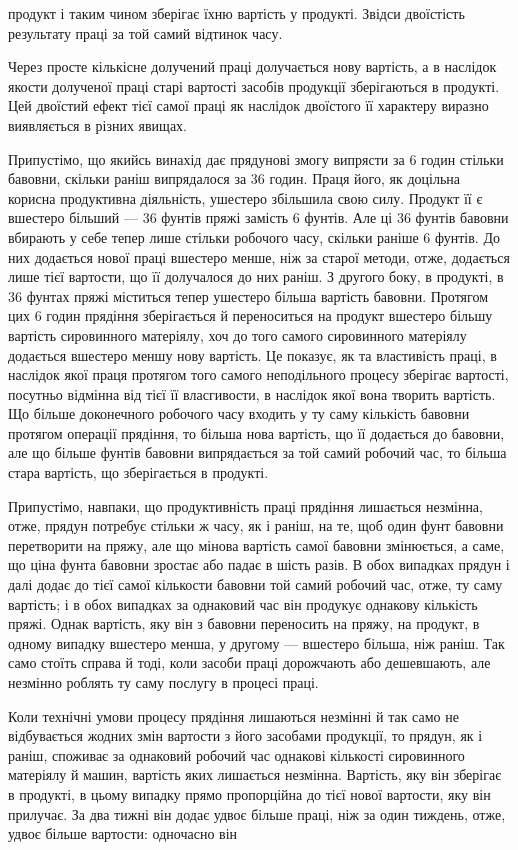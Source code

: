 продукт і таким чином зберігає їхню вартість у продукті. Звідси
двоїстість результату праці за той самий відтинок часу.

Через просте кількісне долучений праці долучається нову
вартість, а в наслідок якости долученої праці старі вартості засобів
продукції зберігаються в продукті. Цей двоїстий ефект тієї
самої праці як наслідок двоїстого її характеру виразно виявляється
в різних явищах.

Припустімо, що якийсь винахід дає прядунові змогу випрясти
за 6 годин стільки бавовни, скільки раніш випрядалося за 36 годин.
Праця його, як доцільна корисна продуктивна діяльність,
ушестеро збільшила свою силу. Продукт її є вшестеро більший —
36 фунтів пряжі замість 6 фунтів. Але ці 36 фунтів бавовни вбирають
у себе тепер лише стільки робочого часу, скільки раніше
6 фунтів. До них додається нової праці вшестеро менше, ніж за
старої методи, отже, додається лише  тієї вартости, що її долучалося
до них раніш. З другого боку, в продукті, в 36 фунтах
пряжі міститься тепер ушестеро більша вартість бавовни. Протягом
цих 6 годин прядіння зберігається й переноситься на продукт
вшестеро більшу вартість сировинного матеріялу, хоч до
того самого сировинного матеріялу додається вшестеро меншу
нову вартість. Це показує, як та властивість праці, в наслідок
якої праця протягом того самого неподільного процесу зберігає
вартості, посутньо відмінна від тієї її власгивости, в наслідок
якої вона творить вартість. Що більше доконечного робочого
часу входить у ту саму кількість бавовни протягом операції
прядіння, то більша нова вартість, що її додається до бавовни,
але що більше фунтів бавовни випрядається за той самий робочий
час, то більша стара вартість, що зберігається в продукті.

Припустімо, навпаки, що продуктивність праці прядіння лишається
незмінна, отже, прядун потребує стільки ж часу, як і раніш,
на те, щоб один фунт бавовни перетворити на пряжу, але що
мінова вартість самої бавовни змінюється, а саме, що ціна фунта
бавовни зростає або падає в шість разів. В обох випадках прядун
і далі додає до тієї самої кількости бавовни той самий робочий
час, отже, ту саму вартість; і в обох випадках за однаковий час
він продукує однакову кількість пряжі. Однак вартість, яку він
з бавовни переносить на пряжу, на продукт, в одному випадку
вшестеро менша, у другому — вшестеро більша, ніж раніш. Так
само стоїть справа й тоді, коли засоби праці дорожчають або
дешевшають, але незмінно роблять ту саму послугу в процесі
праці.

Коли технічні умови процесу прядіння лишаються незмінні
й так само не відбувається жодних змін вартости з його засобами
продукції, то прядун, як і раніш, споживає за однаковий робочий
час однакові кількості сировинного матеріялу й машин, вартість
яких лишається незмінна. Вартість, яку він зберігає в продукті,
в цьому випадку прямо пропорційна до тієї нової вартости, яку
він прилучає. За два тижні він додає удвоє більше праці, ніж
за один тиждень, отже, удвоє більше вартости: одночасно він
